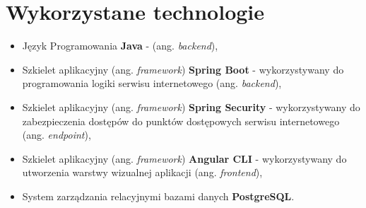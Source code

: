 \section{Wykorzystane technologie}
\begin{itemize}
	\item Język Programowania \textbf{Java} - (ang. \textit{backend}),
	\item Szkielet aplikacyjny (ang. \textit{framework}) \textbf{Spring Boot} - wykorzystywany do programowania logiki serwisu internetowego (ang. \textit{backend}),
	\item Szkielet aplikacyjny (ang. \textit{framework}) \textbf{Spring Security} - wykorzystywany do zabezpieczenia dostępów do punktów dostępowych serwisu internetowego (ang. \textit{endpoint}),
	\item Szkielet aplikacyjny (ang. \textit{framework}) \textbf{Angular CLI} - wykorzystywany do utworzenia warstwy wizualnej aplikacji (ang. \textit{frontend}),
	\item System zarządzania relacyjnymi bazami danych \textbf{PostgreSQL}.
\end{itemize}

